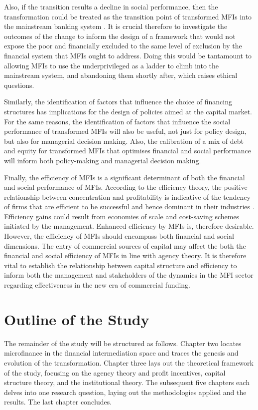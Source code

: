 \documentclass[a4paper, nobind]{templates/ociamthesis}
\begin{document}
Also, if the transition results a decline in social performance, then the transformation could be treated as the transition point of transformed MFIs into the mainstream banking system \autocite{kent2013bankers}. It is crucial therefore to investigate the outcomes of the change to inform the design of a framework that would not expose the poor and financially excluded to the same level of exclusion by the financial system that MFIs ought to address. Doing this would be tantamount to allowing MFIs to use the underprivileged as a ladder to climb into the mainstream system, and abandoning them shortly after, which raises ethical questions.

Similarly, the identification of factors that influence the choice of financing structures has implications for the design of policies aimed at the capital market. For the same reasons, the identification of factors that influence the social performance of transformed MFIs will also be useful, not just for policy design, but also for managerial decision making. Also, the calibration of a mix of debt and equity for transformed MFIs that optimises financial and social performance will inform both policy-making and managerial decision making.

Finally, the efficiency of MFIs is a significant determinant of both the financial and social performance of MFIs. According to the efficiency theory, the positive relationship between concentration and profitability is indicative of the tendency of firms that are efficient to be successful and hence dominant in their industries \autocite{lipczynski2005industrial}. Efficiency gains could result from economies of scale and cost-saving schemes initiated by the management. Enhanced efficiency by MFIs is, therefore desirable. However, the efficiency of MFIs should encompass both financial and social dimensions. The entry of commercial sources of capital may affect the both the financial and social efficiency of MFIs in line with agency theory. It is therefore vital to establish the relationship between capital structure and efficiency to inform both the management and stakeholders of the dynamics in the MFI sector regarding effectiveness in the new era of commercial funding.

\hypertarget{outline-of-the-study}{%
\section{Outline of the Study}\label{outline-of-the-study}}

\noindent The remainder of the study will be structured as follows. Chapter two locates microfinance in the financial intermediation space and traces the genesis and evolution of the transformation. Chapter three lays out the theoretical framework of the study, focusing on the agency theory and profit incentives, capital structure theory, and the institutional theory. The subsequent five chapters each delves into one research question, laying out the methodologies applied and the results. The last chapter concludes.
\end{document}
